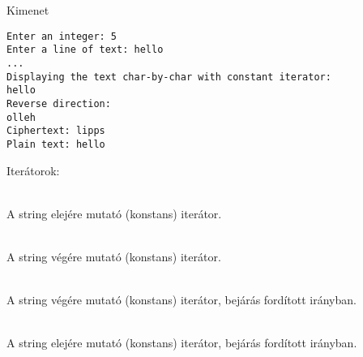 \begin{frame}
    \begin{exampleblock}{}
        
    \end{exampleblock}
\end{frame}

\begin{frame}[fragile]
    \begin{block}{Kimenet}
        \vspace{-.4cm}
        \begin{verbatim}
Enter an integer: 5
Enter a line of text: hello
...
Displaying the text char-by-char with constant iterator:
hello
Reverse direction:
olleh
Ciphertext: lipps
Plain text: hello
\end{verbatim}
        \vspace{-.3cm}
    \end{block}
\end{frame}

\begin{frame}
    Iterátorok:
    \begin{description}[m]
        \item[\hiv{\href{https://en.cppreference.com/w/cpp/string/basic_string/begin}{\texttt{begin()}, \texttt{cbegin()}}}] \hfill \\ A string elejére mutató (konstans) iterátor.
        \item[\hiv{\href{https://en.cppreference.com/w/cpp/string/basic_string/end}{\texttt{end()}, \texttt{cend()}}}] \hfill \\ A string végére mutató (konstans) iterátor.
        \item[\hiv{\href{https://en.cppreference.com/w/cpp/string/basic_string/rbegin}{\texttt{rbegin()}, \texttt{crbegin()}}}] \hfill \\ A string végére mutató (konstans) iterátor, bejárás fordított irányban.
        \item[\hiv{\href{https://en.cppreference.com/w/cpp/string/basic_string/rend}{\texttt{rend()}, \texttt{crend()}}}] \hfill \\ A string elejére mutató (konstans) iterátor, bejárás fordított irányban.
    \end{description}
    \vfill
\end{frame}

